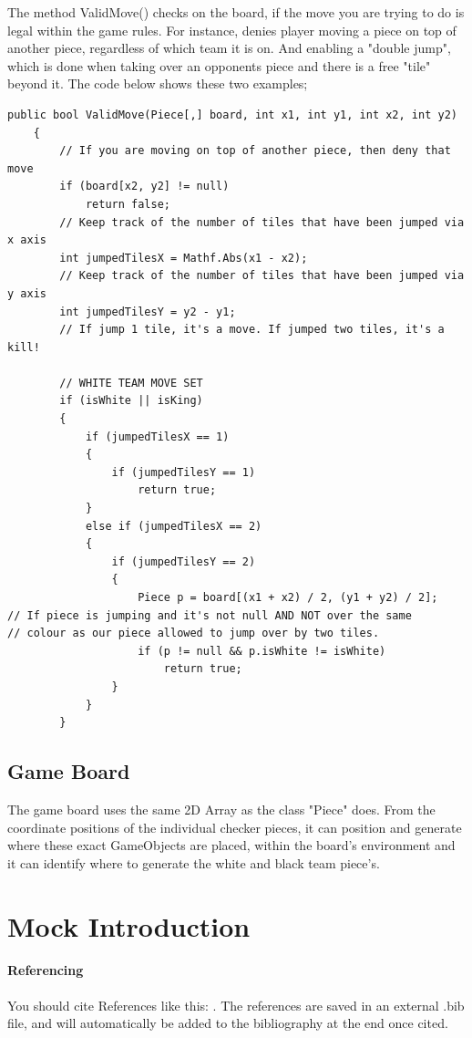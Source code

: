 \documentclass[10pt, a4paper]{article}
\begin{document}
	The method ValidMove() checks on the board, if the move you are trying to do is legal within the game rules. For instance, denies player moving a piece on top of another piece, regardless of which team it is on. And enabling a "double jump", which is done when taking over an opponents piece and there is a free "tile" beyond it. The code below shows these two examples;
	
	\begin{lstlisting}[caption = ValidMove()]
	 public bool ValidMove(Piece[,] board, int x1, int y1, int x2, int y2)
    {
        // If you are moving on top of another piece, then deny that move
        if (board[x2, y2] != null)
            return false;
        // Keep track of the number of tiles that have been jumped via x axis
        int jumpedTilesX = Mathf.Abs(x1 - x2);
        // Keep track of the number of tiles that have been jumped via y axis
        int jumpedTilesY = y2 - y1;
        // If jump 1 tile, it's a move. If jumped two tiles, it's a kill!
        
        // WHITE TEAM MOVE SET
        if (isWhite || isKing)
        {
            if (jumpedTilesX == 1)
            {
                if (jumpedTilesY == 1)
                    return true;
            }
            else if (jumpedTilesX == 2)
            {
                if (jumpedTilesY == 2)
                {
                    Piece p = board[(x1 + x2) / 2, (y1 + y2) / 2];
// If piece is jumping and it's not null AND NOT over the same
// colour as our piece allowed to jump over by two tiles.
                    if (p != null && p.isWhite != isWhite)
                        return true;
                }
            }
        }
	\end{lstlisting}
	
	
	\subsection{Game Board}
	The game board uses the same 2D Array as the class "Piece" does. From the coordinate positions of the individual checker pieces, it can position and generate where these exact GameObjects are placed, within the board's environment and it can identify where to generate the white and black team piece's.
	
    \section{Mock Introduction}
    \paragraph{Referencing}
    You should cite References like this: \cite{Keshav}. The references are saved in an external .bib file, and will automatically be added to the bibliography at the end once cited.
    
\end{document}
